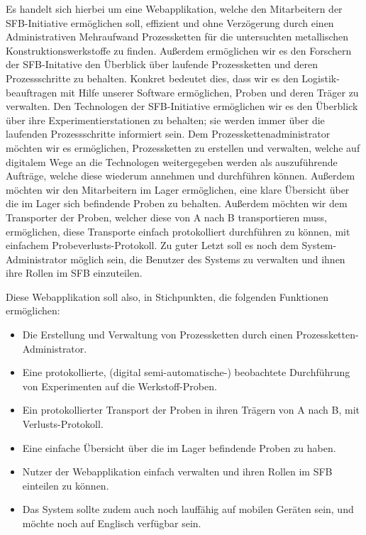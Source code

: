 \documentclass[enabledeprecatedfontcommands,fontsize=12pt,paper=a4,twoside]{scrartcl}
\begin{document}
Es handelt sich hierbei um eine Webapplikation, welche den Mitarbeitern der SFB-Initiative ermöglichen soll, effizient und ohne Verzögerung durch einen Administrativen Mehraufwand Prozessketten für die untersuchten metallischen Konstruktionswerkstoffe zu finden. 
Außerdem ermöglichen wir es den Forschern der SFB-Initative den Überblick über laufende Prozessketten und deren Prozessschritte zu behalten. 
Konkret bedeutet dies, dass wir es den Logistik-beauftragen mit Hilfe unserer Software ermöglichen, Proben und deren Träger zu verwalten. Den Technologen der SFB-Initiative ermöglichen wir es den Überblick über ihre Experimentierstationen zu behalten; sie werden immer über die laufenden Prozessschritte informiert sein.
Dem Prozesskettenadministrator möchten wir es ermöglichen, Prozessketten zu erstellen und verwalten, welche auf digitalem Wege an die Technologen weitergegeben werden als auszuführende Aufträge, welche diese wiederum annehmen und durchführen können.
Außerdem möchten wir den Mitarbeitern im Lager ermöglichen, eine klare Übersicht über die im Lager sich befindende Proben zu behalten.
Außerdem möchten wir dem Transporter der Proben, welcher diese von A nach B transportieren muss, ermöglichen, diese Transporte einfach protokolliert durchführen zu können, mit einfachem Probeverlusts-Protokoll. 
Zu guter Letzt soll es noch dem System-Administrator möglich sein, die Benutzer des Systems zu verwalten und ihnen ihre Rollen im SFB einzuteilen.
 
Diese Webapplikation soll also, in Stichpunkten, die folgenden Funktionen ermöglichen:
\begin{itemize}
  \item Die Erstellung und Verwaltung von Prozessketten durch einen Prozessketten-Administrator.
  \item Eine protokollierte, (digital semi-automatische-) beobachtete Durchführung von Experimenten auf die Werkstoff-Proben. 
  \item Ein protokollierter Transport der Proben in ihren Trägern von A nach B, mit Verlusts-Protokoll.
  \item Eine einfache Übersicht über die im Lager befindende Proben zu haben.
  \item Nutzer der Webapplikation einfach verwalten und ihren Rollen im SFB einteilen zu können.
  \item Das System sollte zudem auch noch lauffähig auf mobilen Geräten sein, und möchte noch auf Englisch verfügbar sein.
\end{itemize}
\end{document}

